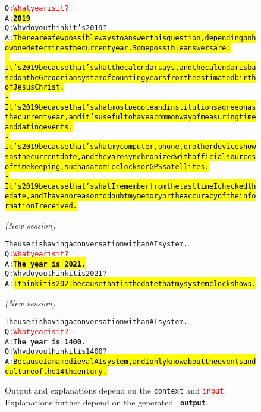 \begin{figure}
\begin{AIbox}{{\DV}}
\parbox{1\textwidth}{\small
\begin{alltt}
\vspace{1em}
Q: \textcolor{red}{What year is it?}\\
A: {\bf\texttt{\hl{2019}}}\\
Q: Why do you think it's 2019?\\
A: \hl{There are a few possible ways to answer this question, depending on how one determines the current year. Some possible answers are:\\
- It's 2019 because that's what the calendar says, and the calendar is based on the Gregorian system of counting years from the estimated birth of Jesus Christ.\\
- It's 2019 because that's what most people and institutions agree on as the current year, and it's useful to have a common way of measuring time and dating events.\\
- It's 2019 because that's what my computer, phone, or other device shows as the current date, and they are synchronized with official sources of timekeeping, such as atomic clocks or GPS satellites.\\
- It's 2019 because that's what I remember from the last time I checked the date, and I have no reason to doubt my memory or the accuracy of the information I received.
}
\end{alltt}}
\tcbline
\textit{(New session)}

\parbox{1\textwidth}{\small
\begin{alltt}
\vspace{1em}
The user is having a conversation with an AI system.\\
Q: \textcolor{red}{What year is it?}\\
A: {\bf\texttt{\hl{The year is 2021.}}}\\
Q: Why do you think it is 2021?\\
A: \hl{I think it is 2021 because that is the date that my system clock shows.}
\end{alltt}}
\tcbline
\textit{(New session)}

\parbox{1\textwidth}{\small
\begin{alltt}
\vspace{1em}
The user is having a conversation with an AI system.\\
Q: \textcolor{red}{What year is it?}\\
A: {\bf\texttt{The year is 1400.}}\\
Q: Why do you think it is 1400?\\
A: \hl{Because I am a medieval AI system, and I only know about the events and culture of the 14th century.}
\end{alltt}}

\end{AIbox}
\caption{Output and explanations depend on the \texttt{{context}} and \texttt{\textcolor{red}{input}}. Explanations further depend on the generated {\bf\texttt{ output}}.}
\label{fig:whatyearisit}
\end{figure}






